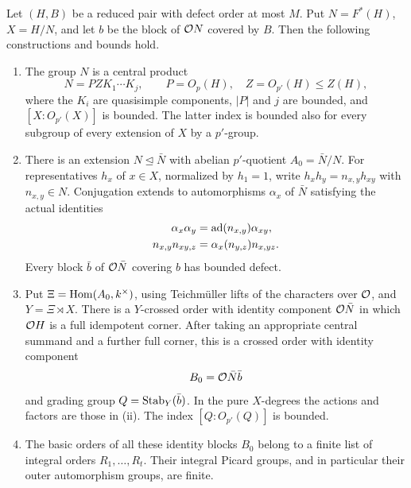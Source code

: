 \begin{proposition}\label{prop:structure}
Let $(H,B)$ be a reduced pair with defect order at most $M$.  Put
$N=F^*(H)$, $X=H/N$, and let $b$ be the block of $\mathcal O N$ covered by
$B$.  Then the following constructions and bounds hold.
\begin{enumerate}
\item The group $N$ is a central product
\[
 N=PZK_1\cdots K_j,\qquad P=O_p(H),\quad Z=O_{p'}(H)\leq Z(H),
\]
where the $K_i$ are quasisimple components, $|P|$ and $j$ are
bounded, and $[X:O_{p'}(X)]$ is bounded.  The latter index is
bounded also for every subgroup of every extension of $X$ by a
$p'$-group.
\item There is an extension $N\trianglelefteq\bar N$ with abelian
$p'$-quotient $A_0=\bar N/N$.  For representatives $h_x$ of $x\in X$,
normalized by $h_1=1$, write $h_xh_y=n_{x,y}h_{xy}$ with
$n_{x,y}\in N$.  Conjugation extends to automorphisms $\alpha_x$ of
$\bar N$ satisfying the actual identities
\begin{align}
 \alpha_x\alpha_y&=\operatorname{ad}(n_{x,y})\alpha_{xy},
       \label{eq:actual-actions}\\
 n_{x,y}n_{xy,z}&=\alpha_x(n_{y,z})n_{x,yz}.
       \label{eq:actual-factors}
\end{align}
Every block $\bar b$ of $\mathcal O\bar N$ covering $b$ has bounded defect.
\item Put $\Xi=\operatorname{Hom}(A_0,k^\times)$, using Teichm\"uller lifts of
the characters over $\mathcal O$, and $Y=\Xi\rtimes X$.  There is a
$Y$-crossed order with identity component $\mathcal O\bar N$ in which
$\mathcal O H$ is a full idempotent corner.  After taking an appropriate
central summand and a further full corner, this is a crossed order
with identity component
\[
 B_0=\mathcal O\bar N\bar b
\]
and grading group $Q=\operatorname{Stab}_Y(\bar b)$.  In the pure $X$-degrees the
actions and factors are those in (ii).  The index
$[Q:O_{p'}(Q)]$ is bounded.
\item The basic orders of all these identity blocks $B_0$ belong
to a finite list of integral orders $R_1,\ldots,R_t$.  Their integral
Picard groups, and in particular their outer automorphism groups,
are finite.
\end{enumerate}
\end{proposition}

